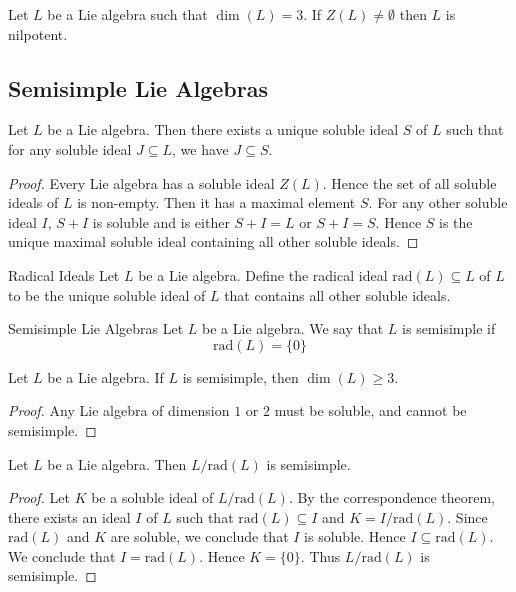 \documentclass[a4paper]{article}
\begin{document}
\begin{lmm}{}{} Let $L$ be a Lie algebra such that $\dim(L)=3$. If $Z(L)\neq\emptyset$ then $L$ is nilpotent. 
\end{lmm}

\subsection{Semisimple Lie Algebras}
\begin{lmm}{}{} Let $L$ be a Lie algebra. Then there exists a unique soluble ideal $S$ of $L$ such that for any soluble ideal $J\subseteq L$, we have $J\subseteq S$. \tcbline
\begin{proof}
Every Lie algebra has a soluble ideal $Z(L)$. Hence the set of all soluble ideals of $L$ is non-empty. Then it has a maximal element $S$. For any other soluble ideal $I$, $S+I$ is soluble and is either $S+I=L$ or $S+I=S$. Hence $S$ is  the unique maximal soluble ideal containing all other soluble ideals. 
\end{proof}
\end{lmm}

\begin{defn}{Radical Ideals}{} Let $L$ be a Lie algebra. Define the radical ideal $\text{rad}(L)\subseteq L$ of $L$ to be the unique soluble ideal of $L$ that contains all other soluble ideals. 
\end{defn}

\begin{defn}{Semisimple Lie Algebras}{}{} Let $L$ be a Lie algebra. We say that $L$ is semisimple if $$\text{rad}(L)=\{0\}$$
\end{defn}

\begin{lmm}{}{} Let $L$ be a Lie algebra. If $L$ is semisimple, then $\dim(L)\geq 3$. \tcbline
\begin{proof}
Any Lie algebra of dimension $1$ or $2$ must be soluble, and cannot be semisimple. 
\end{proof}
\end{lmm}

\begin{lmm}{}{} Let $L$ be a Lie algebra. Then $L/\text{rad}(L)$ is semisimple. \tcbline
\begin{proof}
Let $K$ be a soluble ideal of $L/\text{rad}(L)$. By the correspondence theorem, there exists an ideal $I$ of $L$ such that $\text{rad}(L)\subseteq I$ and $K=I/\text{rad}(L)$. Since $\text{rad}(L)$ and $K$ are soluble, we conclude that $I$ is soluble. Hence $I\subseteq\text{rad}(L)$. We conclude that $I=\text{rad}(L)$. Hence $K=\{0\}$. Thus $L/\text{rad}(L)$ is semisimple. 
\end{proof}
\end{lmm}
\end{document}
